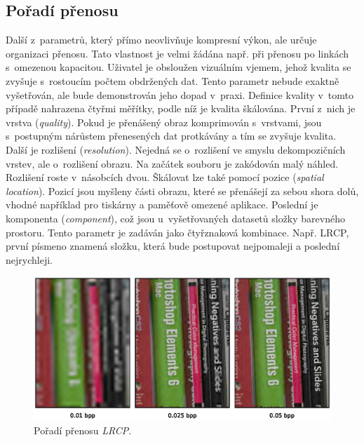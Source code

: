 \subsection*{Pořadí přenosu}
Další z~parametrů, který přímo neovlivňuje kompresní výkon, ale určuje organizaci přenosu. Tato vlastnost je velmi žádána např. při přenosu po linkách s~omezenou kapacitou. Uživatel je obsloužen vizuálním vjemem, jehož kvalita se zvyšuje s~rostoucím počtem obdržených dat. Tento parametr nebude exaktně vyšetřován, ale bude demonstrován jeho dopad v~praxi. Definice kvality v~tomto případě nahrazena čtyřmi měřítky, podle níž je kvalita škálována. První z~nich je vrstva (\textit{quality}). Pokud je přenášený obraz komprimován s~vrstvami, jsou s~postupným nárůstem přenesených dat protkávány a tím se zvyšuje kvalita. Další je rozlišení (\textit{resolution}). Nejedná se o~rozlišení ve smyslu dekompozičních vrstev, ale o~rozlišení obrazu. Na začátek souboru je zakódován malý náhled. Rozlišení roste v~násobcích dvou. Škálovat lze také pomocí pozice (\textit{spatial location}). Pozicí jsou myšleny části obrazu, které se přenášejí za sebou shora dolů, vhodné například pro tiskárny a paměťově omezené aplikace. Poslední je komponenta (\textit{component}), což jsou u~vyšetřovaných datasetů složky barevného prostoru. Tento parametr je zadáván jako čtyřznaková kombinace. Např. LRCP, první písmeno znamená složku, která bude postupovat nejpomaleji a poslední nejrychleji. 

\begin{figure}[hbt!]
  \centering
  \hspace*{-0.75cm}
  \includegraphics[width=16cm]{obrazky-figures/order/lrcp.eps}
  \caption{Pořadí přenosu \textit{LRCP}.}
\end{figure}

